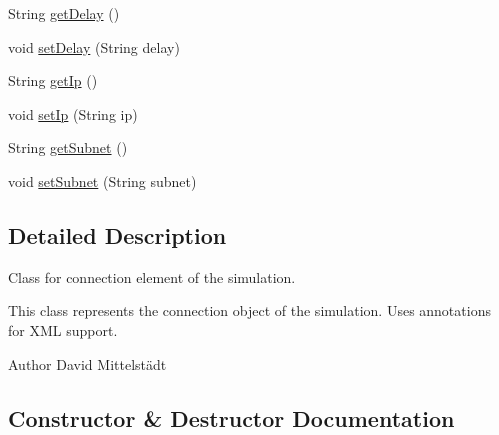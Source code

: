 \begin{DoxyCompactItemize}
String \hyperlink{classde_1_1hsbremen_1_1siprenz_1_1model_1_1xml_1_1Connection_ab218b1b4de16bbb1b735b850d26ffe79}{get\+Delay} ()
\item 
void \hyperlink{classde_1_1hsbremen_1_1siprenz_1_1model_1_1xml_1_1Connection_ac683705c2b3c99d564a40e7893ff3b52}{set\+Delay} (String delay)
\item 
String \hyperlink{classde_1_1hsbremen_1_1siprenz_1_1model_1_1xml_1_1Connection_a8ef577b35fa507a9a1be48d5f7f0a599}{get\+Ip} ()
\item 
void \hyperlink{classde_1_1hsbremen_1_1siprenz_1_1model_1_1xml_1_1Connection_a148d6f5704ef2c1391e0238fc770c0e7}{set\+Ip} (String ip)
\item 
String \hyperlink{classde_1_1hsbremen_1_1siprenz_1_1model_1_1xml_1_1Connection_a236028678fa730814118e1f947b4abed}{get\+Subnet} ()
\item 
void \hyperlink{classde_1_1hsbremen_1_1siprenz_1_1model_1_1xml_1_1Connection_ad0cd420838d99db231eec532631abf04}{set\+Subnet} (String subnet)
\end{DoxyCompactItemize}


\subsection{Detailed Description}
Class for connection element of the simulation. 

This class represents the connection object of the simulation. Uses annotations for X\+ML support.

\begin{DoxyAuthor}{Author}
David Mittelstädt 
\end{DoxyAuthor}


\subsection{Constructor \& Destructor Documentation}
